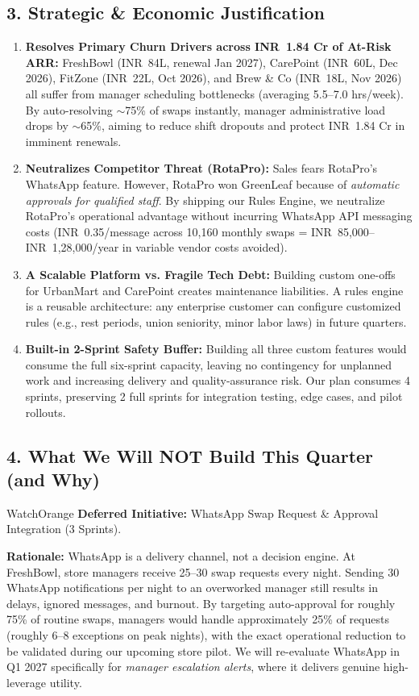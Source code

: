 \documentclass[10pt,a4paper]{article}
\newcommand{\INR}{INR~}
\begin{document}
\subsection*{3. Strategic \& Economic Justification}
\begin{enumerate}[label=\textbf{\Alph*.}]
    \item \textbf{Resolves Primary Churn Drivers across \INR 1.84 Cr of At-Risk ARR:}
    FreshBowl (\INR 84L, renewal Jan 2027), CarePoint (\INR 60L, Dec 2026), FitZone (\INR 22L, Oct 2026), and Brew \& Co (\INR 18L, Nov 2026) all suffer from manager scheduling bottlenecks (averaging 5.5--7.0 hrs/week). By auto-resolving $\sim$75\% of swaps instantly, manager administrative load drops by $\sim$65\%, aiming to reduce shift dropouts and protect \INR 1.84 Cr in imminent renewals.
    \item \textbf{Neutralizes Competitor Threat (RotaPro):}
    Sales fears RotaPro's WhatsApp feature. However, RotaPro won GreenLeaf because of \textit{automatic approvals for qualified staff}. By shipping our Rules Engine, we neutralize RotaPro's operational advantage without incurring WhatsApp API messaging costs (\INR 0.35/message across 10,160 monthly swaps = \INR 85,000--\INR 1,28,000/year in variable vendor costs avoided).
    \item \textbf{A Scalable Platform vs. Fragile Tech Debt:}
    Building custom one-offs for UrbanMart and CarePoint creates maintenance liabilities. A rules engine is a reusable architecture: any enterprise customer can configure customized rules (e.g., rest periods, union seniority, minor labor laws) in future quarters.
    \item \textbf{Built-in 2-Sprint Safety Buffer:}
    Building all three custom features would consume the full six-sprint capacity, leaving no contingency for unplanned work and increasing delivery and quality-assurance risk. Our plan consumes 4 sprints, preserving 2 full sprints for integration testing, edge cases, and pilot rollouts.
\end{enumerate}

\subsection*{4. What We Will NOT Build This Quarter (and Why)}
\begin{accentbox}{WatchOrange}
\footnotesize
\textbf{Deferred Initiative:} WhatsApp Swap Request \& Approval Integration (3 Sprints).
\end{accentbox}
\vspace{1mm}
\noindent
\textbf{Rationale:} WhatsApp is a delivery channel, not a decision engine. At FreshBowl, store managers receive 25--30 swap requests every night. Sending 30 WhatsApp notifications per night to an overworked manager still results in delays, ignored messages, and burnout. By targeting auto-approval for roughly 75\% of routine swaps, managers would handle approximately 25\% of requests (roughly 6--8 exceptions on peak nights), with the exact operational reduction to be validated during our upcoming store pilot. We will re-evaluate WhatsApp in Q1 2027 specifically for \textit{manager escalation alerts}, where it delivers genuine high-leverage utility.
\end{document}
